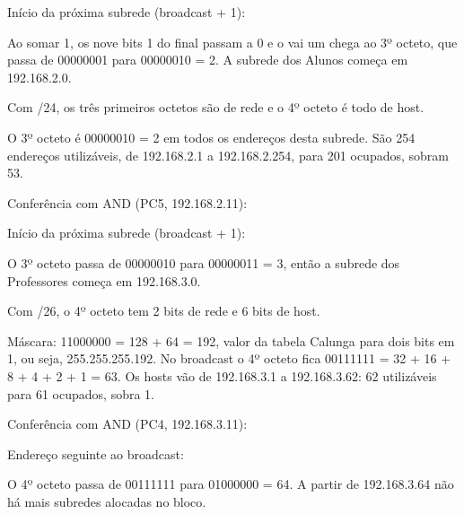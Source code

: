 

Início da próxima subrede (broadcast + 1):



Ao somar 1, os nove bits 1 do final passam a 0 e o vai um chega ao 3º octeto, que passa de 00000001 para 00000010 = 2. A subrede dos Alunos começa em 192.168.2.0.


Com /24, os três primeiros octetos são de rede e o 4º octeto é todo de host.



O 3º octeto é 00000010 = 2 em todos os endereços desta subrede. São 254 endereços utilizáveis, de 192.168.2.1 a 192.168.2.254, para 201 ocupados, sobram 53.

Conferência com AND (PC5, 192.168.2.11):



Início da próxima subrede (broadcast + 1):



O 3º octeto passa de 00000010 para 00000011 = 3, então a subrede dos Professores começa em 192.168.3.0.


Com /26, o 4º octeto tem 2 bits de rede e 6 bits de host.



Máscara: 11000000 = 128 + 64 = 192, valor da tabela Calunga para dois bits em 1, ou seja, 255.255.255.192. No broadcast o 4º octeto fica 00111111 = 32 + 16 + 8 + 4 + 2 + 1 = 63. Os hosts vão de 192.168.3.1 a 192.168.3.62: 62 utilizáveis para 61 ocupados, sobra 1.

Conferência com AND (PC4, 192.168.3.11):



Endereço seguinte ao broadcast:



O 4º octeto passa de 00111111 para 01000000 = 64. A partir de 192.168.3.64 não há mais subredes alocadas no bloco.


